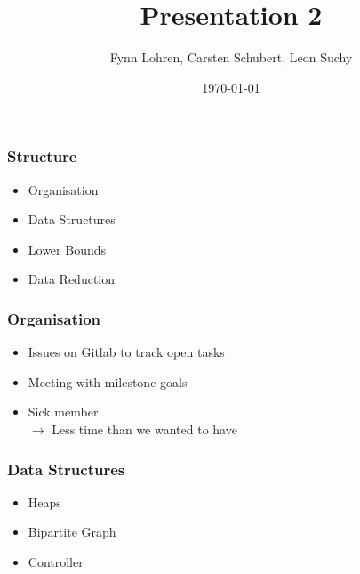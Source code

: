 \documentclass{beamer}[12pt]
\begin{document}
	\title{Presentation 2}
	\author{Fynn Lohren, Carsten Schubert, Leon Suchy}
	\date{\today}
	\frame{\titlepage}
	
	\begin{frame}
		\frametitle{Structure}
		\begin{itemize}[label={-}]
			\item Organisation
			\item Data Structures
			\item Lower Bounds
			\item Data Reduction
		\end{itemize}
	\end{frame}

	\begin{frame}
		\frametitle{Organisation}
		\begin{itemize}[label={-}]
			\item Issues on Gitlab to track open tasks
			\item Meeting with milestone goals
			\item Sick member\\
					$\rightarrow$ Less time than we wanted to have
		\end{itemize}
	\end{frame}
	
	\begin{frame}
		\frametitle{Data Structures}
		\begin{itemize}[label={-}]
			\item Heaps
			\item Bipartite Graph
			\item Controller
		\end{itemize}
	\end{frame}
	
\end{document}
